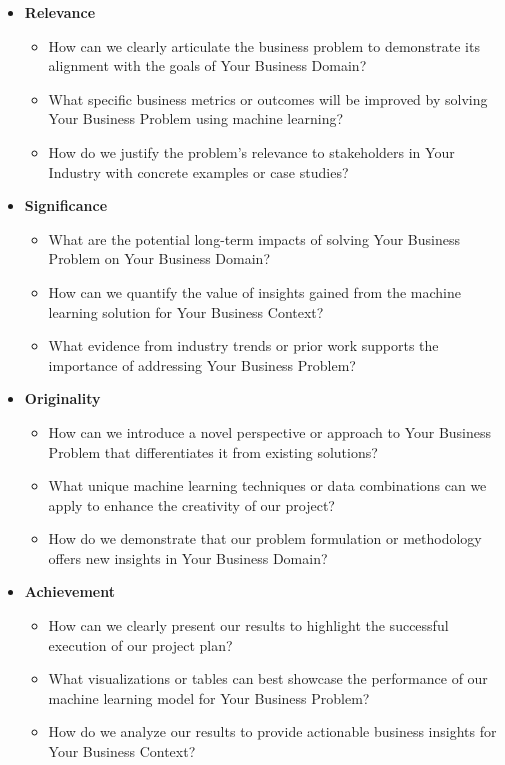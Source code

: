 \documentclass[conference]{IEEEtran}
\begin{document}
\begin{itemize}
    \item \textbf{Relevance}
    \begin{itemize}
        \item How can we clearly articulate the business problem to demonstrate its alignment with the goals of Your Business Domain?
        \item What specific business metrics or outcomes will be improved by solving Your Business Problem using machine learning?
        \item How do we justify the problem's relevance to stakeholders in Your Industry with concrete examples or case studies?
    \end{itemize}
    \item \textbf{Significance}
    \begin{itemize}
        \item What are the potential long-term impacts of solving Your Business Problem on Your Business Domain?
        \item How can we quantify the value of insights gained from the machine learning solution for Your Business Context?
        \item What evidence from industry trends or prior work supports the importance of addressing Your Business Problem?
    \end{itemize}
    \item \textbf{Originality}
    \begin{itemize}
        \item How can we introduce a novel perspective or approach to Your Business Problem that differentiates it from existing solutions?
        \item What unique machine learning techniques or data combinations can we apply to enhance the creativity of our project?
        \item How do we demonstrate that our problem formulation or methodology offers new insights in Your Business Domain?
    \end{itemize}
    \item \textbf{Achievement}
    \begin{itemize}
        \item How can we clearly present our results to highlight the successful execution of our project plan?
        \item What visualizations or tables can best showcase the performance of our machine learning model for Your Business Problem?
        \item How do we analyze our results to provide actionable business insights for Your Business Context?

\end{itemize}
\end{itemize}
\end{document}
